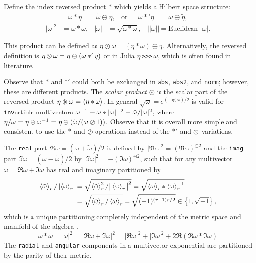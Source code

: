 \documentclass{juliacon}
\DeclareMathOperator*{\obackslash}{\text{\reflectbox{$\oslash$}}}
\begin{document}
\begin{definition}
	Define the index reversed product $\ast$ which yields a Hilbert space structure:
	\begin{align*}
		\omega\ast\eta &= \tilde\omega\ominus\eta, & \text{or} & & \omega\ast'\eta &= \omega\ominus\tilde\eta,
	\end{align*}
	\begin{align*}
		|\omega|^2 &= \omega\ast\omega, & |\omega| &= \sqrt{\omega\ast\omega}, & ||\omega|| = \text{Euclidean }|\omega|.
	\end{align*}
\end{definition}
\begin{definition}
	This product can be defined as $\eta\oslash\omega = (\eta\ast\omega)\ominus\eta$. Alternatively, the reversed definition is $\eta\obackslash\omega = \eta\ominus(\omega\ast'\eta)$ or in Julia $\eta\,$\verb`>>>`$\,\omega$, which is often found in literature.
\end{definition}
\begin{remark}
	Observe that $\ast$ and $\ast'$ could both be exchanged in \verb`abs`, \verb`abs2`, and \verb`norm`; however, these are different products.
	The \textit{scalar product} $\circledast$ is the scalar part of the reversed product $\eta\circledast\omega = \left\langle \eta\ast\omega \right\rangle$.
	In general $\sqrt\omega = e^{(\log\omega)/2}$ is valid for \verb`inv`ertible multivectors $\omega^{-1} = \omega\ast|\omega|^{-2} = \tilde\omega/|\omega|^2$, where $\eta/\omega = \eta\ominus\omega^{-1} = \eta\ominus(\tilde\omega/(\omega\oslash1))$.
	Observe that it is overall more simple and consistent to use the $\ast$ and $\oslash$ operations instead of the $\ast'$ and $\obackslash$ variations.
\end{remark}
The \verb`real` part $\Re\omega = (\omega+\tilde\omega)/2$ is defined by $|\Re\omega|^2 = (\Re\omega)^{\ominus2}$ and the \verb`imag` part $\Im\omega = (\omega-\tilde\omega)/2$ by $|\Im\omega|^2 = -(\Im\omega)^{\ominus2}$, such that for any multivector $\omega = \Re\omega+\Im\omega$ has real and imaginary partitioned by
\begin{align*}
	\left\langle \tilde\omega \right\rangle_r/\left|\left\langle \omega \right\rangle_r\right| &= \sqrt{\left\langle \tilde\omega \right\rangle_r^2/\big|\left\langle \omega \right\rangle_r\big|^2} = \sqrt{\left\langle \omega \right\rangle_r\ast\left\langle \omega \right\rangle_r^{-1}} \\
	&= \sqrt{\left\langle \tilde\omega \right\rangle_r/\left\langle \omega \right\rangle_r}=\sqrt{(-1)^{(r-1)r/2}} \in\left\{ 1,\sqrt{-1} \right\},
\end{align*}
which is a unique partitioning completely independent of the metric space and manifold of the algebra \cite{chappell-iqbal-gunn-abbott}.
$$ \omega\ast\omega = |\omega|^2 = |\Re\omega+\Im\omega|^2 = %
|\Re\omega|^2+|\Im\omega|^2 + 2\Re(\Re\omega\ast\Im\omega) $$
The \verb`radial` and \verb`angular` components in a multivector exponential are partitioned by the parity of their metric.
\end{document}
